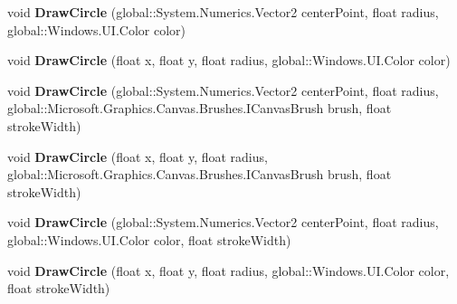 \begin{DoxyCompactItemize}
\item 
\mbox{\label{class_microsoft_1_1_graphics_1_1_canvas_1_1_canvas_drawing_session_a996ecefdbf4c783953dc55fd8689ccca}} 
void {\bfseries Draw\+Circle} (global\+::\+System.\+Numerics.\+Vector2 center\+Point, float radius, global\+::\+Windows.\+U\+I.\+Color color)
\item 
\mbox{\label{class_microsoft_1_1_graphics_1_1_canvas_1_1_canvas_drawing_session_a4ee8397d940e90ed47b1c1bc93f08e6c}} 
void {\bfseries Draw\+Circle} (float x, float y, float radius, global\+::\+Windows.\+U\+I.\+Color color)
\item 
\mbox{\label{class_microsoft_1_1_graphics_1_1_canvas_1_1_canvas_drawing_session_aaeaab312190aa6abaa39544f0d505d26}} 
void {\bfseries Draw\+Circle} (global\+::\+System.\+Numerics.\+Vector2 center\+Point, float radius, global\+::\+Microsoft.\+Graphics.\+Canvas.\+Brushes.\+I\+Canvas\+Brush brush, float stroke\+Width)
\item 
\mbox{\label{class_microsoft_1_1_graphics_1_1_canvas_1_1_canvas_drawing_session_a5e93f017906856d7261ece2c0c017679}} 
void {\bfseries Draw\+Circle} (float x, float y, float radius, global\+::\+Microsoft.\+Graphics.\+Canvas.\+Brushes.\+I\+Canvas\+Brush brush, float stroke\+Width)
\item 
\mbox{\label{class_microsoft_1_1_graphics_1_1_canvas_1_1_canvas_drawing_session_a84a70b9c50b68b7c5f874112da8acaa4}} 
void {\bfseries Draw\+Circle} (global\+::\+System.\+Numerics.\+Vector2 center\+Point, float radius, global\+::\+Windows.\+U\+I.\+Color color, float stroke\+Width)
\item 
\mbox{\label{class_microsoft_1_1_graphics_1_1_canvas_1_1_canvas_drawing_session_a495a425c73d550076f84dfa13f91483d}} 
void {\bfseries Draw\+Circle} (float x, float y, float radius, global\+::\+Windows.\+U\+I.\+Color color, float stroke\+Width)
\item 

\end{DoxyCompactItemize}
